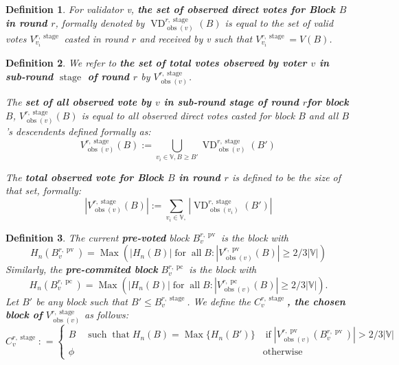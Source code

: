 \documentclass{article}
\newcommand{\assign}{:=}
\newcommand{\tmop}[1]{\ensuremath{\operatorname{#1}}}
\newcommand{\tmstrong}[1]{\textbf{#1}}
\newcommand{\tmtextbf}[1]{{\bfseries{#1}}}
\newtheorem{definition}{Definition}
\providecommand{\tmop}[1]{\ensuremath{\mathrm{#1}}}
\providecommand{\tmstrong}[1]{\tmtextbf{#1}}
\providecommand{\tmtextbf}[1]{\tmtextbf{#1}}
\newtheorem{definition}{Definition}
\begin{document}
\begin{definition}
  For validator v, {\tmstrong{the set of observed direct votes for Block $B$ in
  round $r$}}, formally denoted by $\tmop{VD}^{r, \tmop{stage}}_{\tmop{obs}
  (v)}^{}_{} (B)$ is equal to the set of valid votes $V^{r,
  \tmop{stage}}_{v_i}$ casted in round $r$ and received by v such that $V^{r,
  \tmop{stage}}_{v_i} = V (B)$.
\end{definition}

\begin{definition}
  We refer to {\tmstrong{the set of total votes observed by voter $v$ in
  sub-round $\tmop{stage}$ of round $r$}} by {\tmstrong{$V^{r,
  \tmop{stage}}_{\tmop{obs} (v)}^{}_{}$}}.
  
  The {\tmstrong{set of all observed vote by $v$ in sub-round stage of round
  $r$for block $B$}}, {\tmstrong{$V^{r, \tmop{stage}}_{\tmop{obs} (v)} (B)$}}
  is equal to all observed direct votes casted for block $B$ and all $B$'s
  descendents defined formally as:
  \[ V^{r, \tmop{stage}}_{\tmop{obs} (v)} (B) \assign \bigcup_{v_i \in
     \mathbb{V}, B \geqslant B'} \tmop{VD}^{r, \tmop{stage}}_{\tmop{obs} (v)}
     (B')_{}^{}_{} \]
  {\tmstrong{}}
  
  The {\tmstrong{total observed vote for Block $B$ in round $r$}} is defined
  to be the size of that set, formally:
  \[ | V^{r, \tmop{stage}}_{\tmop{obs} (v)} (B) | \assign \sum_{v_i \in
     \mathbb{V},} | \tmop{VD}^{r, \tmop{stage}}_{\tmop{obs} (v_i)}^{}_{} (B')
     | \]
  
\end{definition}

\begin{definition}
  The current {\tmstrong{pre-voted}} block $B^{r, \tmop{pv}}_v$ is the block
  with
  \[ H_n (B^{r, \tmop{pv}}_v) = \tmop{Max} (| H_n (B) | \tmop{for} \tmop{all}
     B : | V_{\tmop{obs} (v)}^{r, \tmop{pv}} (B) | \geqslant 2 / 3 |
     \mathbb{V} |) \]
  Similarly, the {\tmstrong{pre-commited block }}$B_v^{r, \tmop{pc}}$ is the
  block with
  \[ H_n (B^{r, \tmop{pc}}_v) = \tmop{Max} (| H_n (B) | \tmop{for} \tmop{all}
     B : | V_{\tmop{obs} (v)}^{r, \tmop{pc}} (B) | \geqslant 2 / 3 |
     \mathbb{V} |) . \]
  Let $B'$ be any block such that $B' \leqslant B_v^{r, \tmop{stage}}$. We
  define the {\tmstrong{$C^{r, \tmop{stage}}_v^{}$, the chosen block of}}
  $V^{r, \tmop{stage}}_{\tmop{obs} (v)}^{}_{}$ as follows:
  \[ C^{r, \tmop{stage}}_v^{} :_{} = \left\{ \begin{array}{ll}
       B \quad \tmop{such} \tmop{that} H_n (B) = \tmop{Max} \{ H_n (B') \} &
       \tmop{if} | V_{\tmop{obs} (v)}^{r, \tmop{pv}} (B^{r, \tmop{pv}}_v) | >
       2 / 3 | \mathbb{V} |\\
       \phi & \tmop{otherwise}
     \end{array} \right. \begin{array}{l}
       
     \end{array} \]
  
\end{definition}
\end{document}
